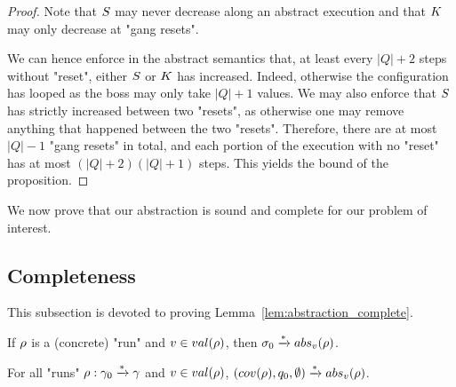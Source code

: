 \ifproofs
\begin{proof}
Note that $S$ may never decrease along an abstract execution and that $\clique$ may only decrease at "gang resets".

We can hence enforce in the abstract semantics that, at least every $|Q|+2$ steps without "reset", either $S$ or $\clique$ has increased. Indeed, otherwise the configuration has looped as the boss may only take $|Q| +1$ values. We may also enforce that $S$ has strictly increased between two "resets", as otherwise one may remove anything that happened between the two "resets". Therefore, there are at most $|Q|-1$ "gang resets" in total, and each portion of the execution with no "reset" has at most $(|Q|+2)(|Q|+1)$ steps. This yields the bound of the proposition. 
\end{proof}
\fi

We now prove that our abstraction is sound and complete for our problem of interest. 

\subsection{Completeness}
This subsection is devoted to proving Lemma~\ref{lem:abstraction_complete}.

\begin{lemma}
\label{lem:abstraction_complete}
If $\rho$ is a (concrete) "run" and $\aval \in \valsof{\run}$, then $\aconfiginit \step{*} \absproj{\aval}{\run}$. 
\end{lemma}



\begin{lemma}
\label{lem:proof_completeness_covset_constant}
For all "runs" $\rho: \gamma_0 \xrightarrow{*} \gamma$ and $\aval \in \valsof{\run}$, $(\statesin{\run}, q_0, \emptyset) \step{*} \absproj{\aval}{\run}$. 
\end{lemma}


